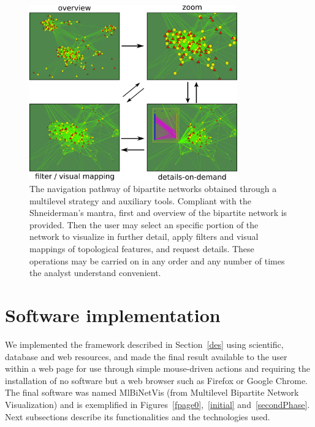 \documentclass[runningheads]{llncs}
\begin{document}
\begin{figure}[!h]\centering
 \includegraphics[width=0.8\textwidth]{fnav___}
  \caption{The navigation pathway of bipartite networks obtained through a multilevel strategy
  and auxiliary tools.
  Compliant with the Shneiderman's mantra, first and overview of the bipartite network is provided.
  Then the user may select an specific portion of the network to visualize in further detail,
  apply filters and visual mappings of topological features, and request details.
  These operations may be carried on in any order and any number of times the analyst understand convenient.
  }\label{fnav}
\end{figure}

\noindent 
\section{Software implementation}\label{sof}
We implemented the framework described in Section~\ref{des} using scientific,
database and web resources,
and made the final result available to the user within a web page
for use through simple mouse-driven actions
and requiring the installation of no software but a web browser such as Firefox or Google Chrome.
The final software was named MlBiNetVis (from Multilevel Bipartite Network Visualization)
and is exemplified in Figures~\ref{fpage0},~\ref{initial} and~\ref{secondPhase}.
Next subsections describe its functionalities and the technologies used.
\end{document}
